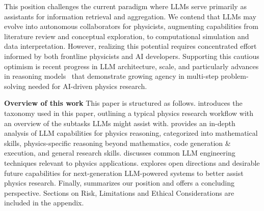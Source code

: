 This position challenges the current paradigm where LLMs serve primarily as assistants for information retrieval and aggregation. We contend that LLMs may evolve into autonomous collaborators for physicists, augmenting capabilities from literature review and conceptual exploration, to computational simulation and data interpretation. However, realizing this potential requires concentrated effort informed by both frontline physicists and AI developers.
Supporting this cautious optimism is recent progress in LLM architecture, scale, and particularly advances in reasoning models~\cite{OpenAI2023GPT4,Anthropic2024Claude,Team2024Gemini,Team2024Geminia,DeepSeek-AI2025DeepSeekV3,Guo2025DeepSeekR1,Team2025Kimi} that demonstrate growing agency in multi-step problem-solving needed for AI-driven physics research.

\textbf{Overview of this work}
This paper is structured as follows.
 introduces the taxonomy used in this paper, outlining a typical physics research workflow with an overview of the subtasks LLMs might assist with.  provides an in-depth analysis of LLM capabilities for physics reasoning, categorized into mathematical skills, physics-specific reasoning beyond mathematics, code generation \& execution, and general research skills.  discusses common LLM engineering techniques relevant to physics applications.  explores open directions and desirable future capabilities for next-generation LLM-powered systems to better assist physics research. Finally,  summarizes our position and offers a concluding perspective.
Sections on Risk, Limitations and Ethical Considerations are included in the appendix.
